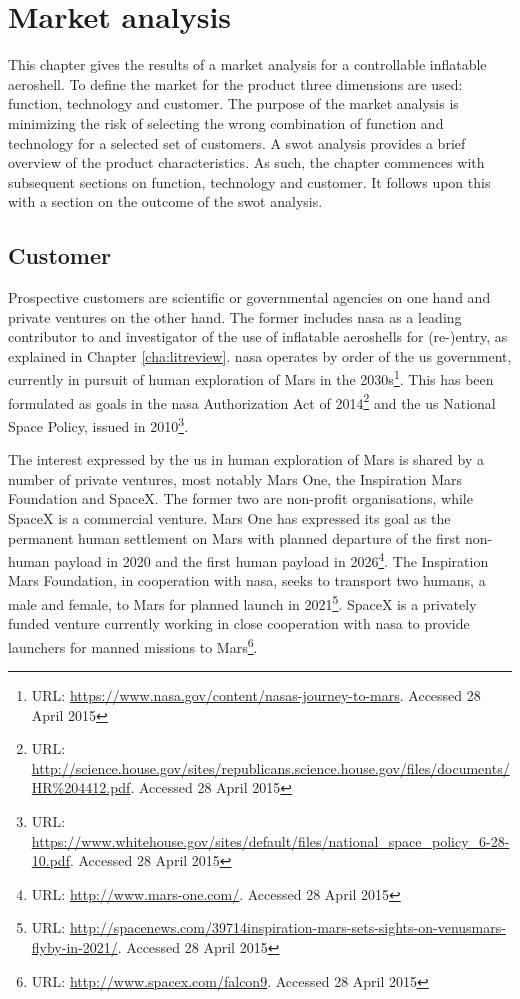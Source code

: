 \section{Market analysis} \label{ch:market}
This chapter gives the results of a market analysis for a controllable inflatable aeroshell. To define the market for the product three dimensions are used: function, technology and customer. The purpose of the market analysis is minimizing the risk of selecting the wrong combination of function and technology for a selected set of customers. A \gls{swot} analysis provides a brief overview of the product characteristics. As such, the chapter commences with subsequent sections on function, technology and customer. It follows upon this with a section on the outcome of the \gls{swot} analysis.

\subsection{Customer}
Prospective customers are scientific or governmental agencies on one hand and private ventures on the other hand. The former includes \gls{nasa} as a leading contributor to and investigator of the use of inflatable aeroshells for (re-)entry, as explained in Chapter \ref{cha:litreview}. \gls{nasa} operates by order of the \gls{us} government, currently in pursuit of human exploration of Mars in the 2030s\footnote{URL: \url{https://www.nasa.gov/content/nasas-journey-to-mars}.  Accessed 28 April 2015}. This has been formulated as goals in the \gls{nasa} Authorization Act of 2014\footnote{URL: \url{http://science.house.gov/sites/republicans.science.house.gov/files/documents/HR\%204412.pdf}. Accessed 28 April 2015} and the \gls{us} National Space Policy, issued in 2010\footnote{URL: \url{https://www.whitehouse.gov/sites/default/files/national\_space\_policy\_6-28-10.pdf}. Accessed 28 April 2015}.

The interest expressed by the \gls{us} in human exploration of Mars is shared by a number of private ventures, most notably Mars One, the Inspiration Mars Foundation and SpaceX. The former two are non-profit organisations, while SpaceX is a commercial venture. Mars One has expressed its goal as the permanent human settlement on Mars with planned departure of the first non-human payload in 2020 and the first human payload in 2026\footnote{URL: \url{http://www.mars-one.com/}. Accessed 28 April 2015}. The Inspiration Mars Foundation, in cooperation with \gls{nasa}, seeks to transport two humans, a male and female, to Mars for planned launch in 2021\footnote{URL: \url{http://spacenews.com/39714inspiration-mars-sets-sights-on-venusmars-flyby-in-2021/}. Accessed 28 April 2015}. SpaceX is a privately funded venture currently working in close cooperation with \gls{nasa} to provide launchers for manned missions to Mars\footnote{URL: \url{http://www.spacex.com/falcon9}. Accessed 28 April 2015}.

